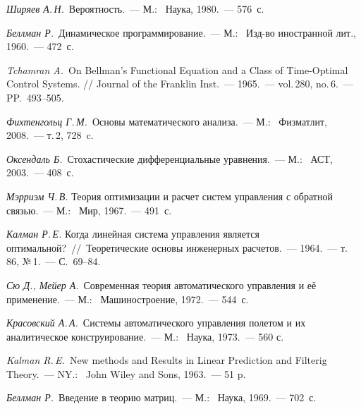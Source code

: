 






\begin{thebibliography}{wlab}


\emph{Ширяев А.\,Н.}~Вероятность.~--- М.:~ Наука, 1980.~--- 576~с.

\emph{Беллман Р.}~Динамическое программирование.~--- М.:~ Изд-во иностранной лит., 1960.~--- 472~с.

\emph{Tchamran A.}~On Bellman's Functional Equation and a Class of Time-Optimal Control Systems. // Journal of the Franklin Inst.~--- 1965.~--- vol.\,280, no.\,6.~--- PP.~493--505.

\emph{Фихтенгольц Г.\,М.}~Основы математического анализа.~--- М.:~ Физматлит, 2008.~--- т.\,2, 728~c.

\emph{Оксендаль Б.}~Стохастические дифференциальные уравнения.~--- М.:~ АСТ, 2003.~--- 408~с.

\emph{Мэрриэм Ч.\,В.} Теория оптимизации и расчет систем управления с обратной связью.~--- М.:~ Мир, 1967.~--- 491~с.

\emph{Калман Р.\,Е.} Когда линейная система управления является оптимальной?~//~Теоретические основы инженерных расчетов.~--- 1964.~--- т.\,86, №\,1.~--- С.~69--84.

\emph{Сю Д., Мейер А.}~Современная теория автоматического управления и её применение.~--- М.:~ Машиностроение, 1972.~--- 544~с.

\emph{Красовский А.\,А.}~Системы автоматического управления полетом и их аналитическое конструирование.~--- М.:~ Наука, 1973.~--- 560 с.

\emph{Kalman R.\,E.}~New methods and Results in Linear Prediction and Filterig Theory.~--- NY.:~ John Wiley and Sons, 1963.~--- 51 p.

\emph{Беллман Р.}~Введение в теорию матриц.~--- М.:~ Наука, 1969.~--- 702~с.


\end{thebibliography}
